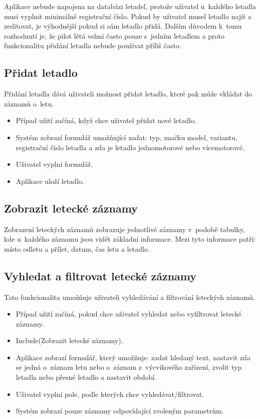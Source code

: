 \documentclass[thesis=M,czech]{FITthesis}[2012/06/26]
\begin{document}
Aplikace nebude napojena na databázi letadel, protože uživatel u~každého letadla musí vyplnit minimálně registrační číslo. Pokud by uživatel musel letadlo najít a zeditovat, je výhodnější pokud si sám letadlo přidá. Dalším důvodem k~tomu rozhodnutí je, že pilot létá velmi často pouze s~jedním letadlem a proto funkcionalitu přidání letadla nebude používat příliš často.

\subsection{Přidat letadlo}
Přidání letadla dává uživateli možnost přidat letadlo, které pak může vkládat do záznamů o~letu.

\begin{itemize}
\item Případ užití začíná, když chce uživatel přidat nové letadlo.
\item Systém zobrazí formulář umožňující zadat: typ, značku model, variantu, registrační číslo letadla a zda je letadlo jednomotorové nebo vícemotorové.
\item Uživatel vyplní formulář.
\item Aplikace uloží letadlo.
\end{itemize}

\subsection{Zobrazit letecké záznamy}
Zobrazení leteckých záznamů zobrazuje jednotlivé záznamy v~podobě tabulky, kde u~každého záznamu jsou vidět základní informace. Mezi tyto informace patří: místo odletu a přílet, datum, čas letu a letadlo.

\subsection{Vyhledat a filtrovat letecké záznamy}
Tato funkcionalita umožňuje uživateli vyhledávání a filtrování leteckých záznamů.

\begin{itemize}
\item Případ užití začíná, pokud chce uživatel vyhledat nebo vyfiltrovat letecké záznamy.
\item Include(Zobrazit letecké záznamy).
\item Aplikace zobrazí formulář, který umožňuje: zadat hledaný text, nastavit zda se jedná o~záznam letu nebo o~záznam z~výcvikového zařízení, zvolit typ letadla nebo přesné letadlo a nastavit období.
\item Uživatel vyplní pole, podle kterých chce vyhledávat/filtrovat.
\item Systém zobrazí pouze záznamy odpovídající zvoleným parametrům.
\end{itemize}
\end{document}
